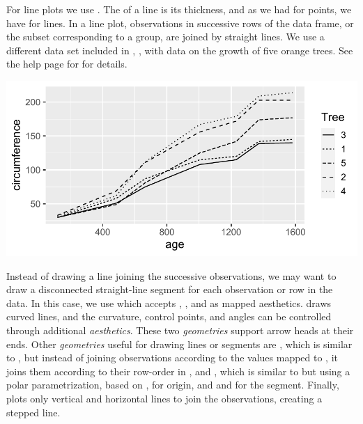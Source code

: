\documentclass[krantz2]{krantz}\usepackage{knitr}
\begin{document}
For line plots we use . The  of a line is its thickness, and as we had  for points, we have  for lines. In a line plot, observations in successive rows of the data frame, or the subset corresponding to a group, are joined by straight lines. We use a different data set included in \Rlang, , with data on the growth of five orange trees. See the help page for  for details.

\label{plot:fig:lines}
\begin{knitrout}\footnotesize
{}\color{fgcolor}\begin{kframe}
\begin{alltt}
\hlstd{(} 
       \hlstd{(}      \hlopt{+}
  \hlstd{()}
\end{alltt}
\end{kframe}

{\centering \includegraphics[width=.7\textwidth]{figure/pos-line-plot-01-1} 

}


\end{knitrout}

Instead of drawing a line joining the successive observations, we may want to draw a disconnected straight-line segment for each observation or row in the data. In this case, we use  which accepts , ,  and  as mapped aesthetics.  draws curved lines, and the curvature, control points, and angles can be controlled through additional \emph{aesthetics}. These two \emph{geometries} support arrow heads at their ends. Other \emph{geometries} useful for drawing lines or segments are , which is similar to , but instead of joining observations according to the values mapped to , it joins them according to their row-order in , and , which is similar to  but using a polar parametrization, based on ,  for origin, and  and  for the segment. Finally,  plots only vertical and horizontal lines to join the observations, creating a stepped line.
\end{document}
